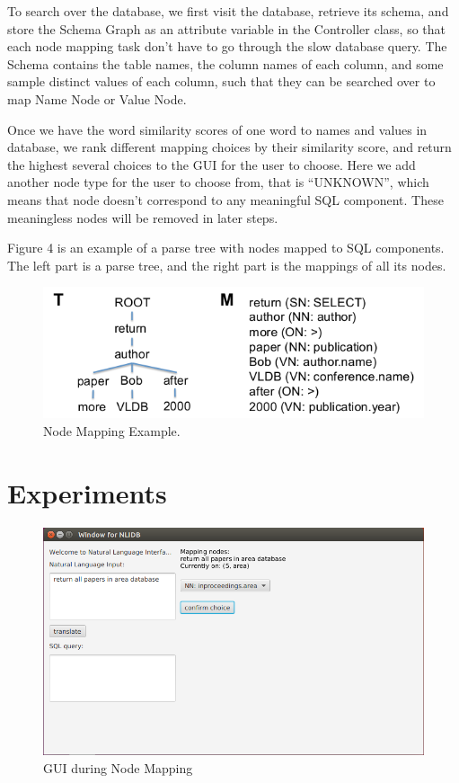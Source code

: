 \documentclass[twocolumn]{article}
\begin{document}
To search over the database, we first visit the database, retrieve its schema, and store the Schema Graph as an attribute variable in the Controller class, so that each node mapping task don’t have to go through the slow database query. The Schema contains the table names, the column names of each column, and some sample distinct values of each column, such that they can be searched over to map Name Node or Value Node.

Once we have the word similarity scores of one word to names and values in database, we rank different mapping choices by their similarity score, and return the highest several choices to the GUI for the user to choose. Here we add another node type for the user to choose from, that is “UNKNOWN”, which means that node doesn’t correspond to any meaningful SQL component. These meaningless nodes will be removed in later steps.

Figure 4 is an example of a parse tree with nodes mapped to SQL components. The left part is a parse tree, and the right part is the mappings of all its nodes.

\begin{figure}[ht]
  \centerline{\includegraphics[width=0.9\linewidth]{figures/nodes_mapping_example.png}}
  \caption[caption for nodes mapping example]{Node Mapping Example.\protect\footnotemark }
\end{figure}



\section{Experiments}

\begin{figure}[ht]
  \centerline{\includegraphics[width=0.7\linewidth]{figures/gui_nodes_mapping.png}}
  \caption{GUI during Node Mapping}
\end{figure}
\end{document}
